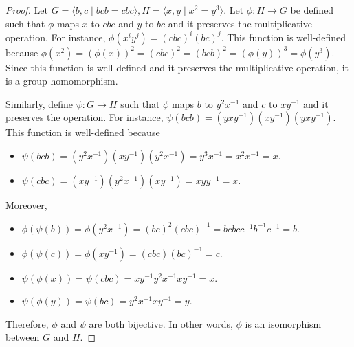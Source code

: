 \documentclass[12pt, psamsfonts]{amsart}
\theoremstyle{definition}
\theoremstyle{remark}
\numberwithin{equation}{section}
\begin{document}
\begin{proof}
  Let $G = \langle b, c \mid bcb = cbc \rangle, H = \langle x, y \mid x^2 = y^3 \rangle$.
  Let $\phi: H \rightarrow G$ be defined such that $\phi$ maps $x$ to $cbc$ and $y$ to $bc$ and it preserves the multiplicative operation.
  For instance, $\phi(x^iy^j) = (cbc)^i(bc)^j$.
  This function is well-defined because $\phi(x^2) = (\phi(x))^2 = (cbc)^2 = (bcb)^2 = (\phi(y))^3 = \phi(y^3)$.
  Since this function is well-defined and it preserves the multiplicative operation, it is a group homomorphism.

  Similarly, define $\psi: G \rightarrow H$ such that $\phi$ maps $b$ to $y^2x^{-1}$ and $c$ to $xy^{-1}$ and it preserves the operation.
  For instance, $\psi(bcb) = (yxy^{-1})(xy^{-1})(yxy^{-1})$.
  This function is well-defined because
  \begin{itemize}
    \item
      $\psi(bcb) = (y^2x^{-1})(xy^{-1})(y^2x^{-1}) = y^3x^{-1} = x^2x^{-1} = x$.
    \item
      $\psi(cbc) = (xy^{-1})(y^2x^{-1})(xy^{-1}) = xyy^{-1} = x$.
  \end{itemize}

  Moreover,

  \begin{itemize}
    \item
      $\phi(\psi(b)) = \phi(y^2x^{-1}) = (bc)^2(cbc)^{-1} = bcbcc^{-1}b^{-1}c^{-1} = b$.
    \item
      $\phi(\psi(c)) = \phi(xy^{-1}) = (cbc)(bc)^{-1} = c$.
    \item
      $\psi(\phi(x)) = \psi(cbc) = xy^{-1}y^2x^{-1}xy^{-1} = x$.
    \item
      $\psi(\phi(y)) = \psi(bc) = y^2x^{-1}xy^{-1} = y$.
  \end{itemize}

  Therefore, $\phi$ and $\psi$ are both bijective.
  In other words, $\phi$ is an isomorphism between $G$ and $H$.
\end{proof}
\end{document}
